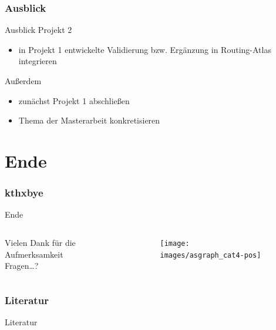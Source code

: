 \documentclass[ngerman,compress,hyperref={bookmarks}]{beamer}
\begin{document}
\section{Ausblick}
\begin{frame}{Ausblick}
  Projekt 2
  \begin{itemize}
    \item in Projekt 1 entwickelte Validierung bzw. Ergänzung in Routing-Atlas integrieren
  \end{itemize}
  \vspace{0.3cm}
  Außerdem
  \begin{itemize}
    \item zunächst Projekt 1 abschließen
    \item Thema der Masterarbeit konkretisieren
  \end{itemize}
\end{frame}

\part{Ende}
\section{kthxbye}
\begin{frame}[plain]{Ende}
\begin{columns}[t]
\begin{column}{0.5\textwidth}
 \begin{center}
 \vspace{1cm}
 Vielen Dank für die Aufmerksamkeit\\
 \vspace{1.5cm}
 Fragen\ldots?
 \end{center}
\end{column}
\begin{column}{0.5\textwidth}
 \vspace{-1cm}
 \begin{figure}
  \label{asngraphs2}
  \texttt{[image: images/asgraph\_cat4-pos]}
 \end{figure}
\end{column}
\end{columns}
\end{frame}

\section{Literatur}
\begin{frame}{Literatur}
\scriptsize


\end{frame}
\end{document}
